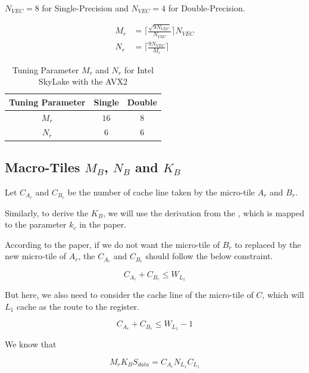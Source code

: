 $N_{VEC} = 8$ for Single-Precision and $N_{VEC} = 4$ for Double-Precision.

\begin{align*}
    M_r &= \lceil \frac{ \sqrt{9 N_{VEC}} }{N_{VEC}} \rceil N_{VEC} \\
    N_r &= \lceil \frac{ 9 N_{VEC} }{M_r} \rceil
\end{align*}

\begin{table}[ht]
    \centering
    \caption{Tuning Parameter $M_r$ and $N_r$ for Intel SkyLake with the AVX2}
    \begin{tabular}{|c|c|c|}
        \hline
        \textbf{Tuning Parameter} & \textbf{Single} & \textbf{Double}\\
        \hline
        $M_r$   & $16$ & $8$ \\
        \hline
        $N_r$   & $6$ & $6$ \\
        \hline
    \end{tabular}
\end{table}

\subsection{Macro-Tiles $M_B$, $N_B$ and $K_B$}

Let $C_{A_r}$ and $C_{B_r}$ be the number of cache line taken by the micro-tile $A_r$ and $B_r$.

Similarly, to derive the $K_B$, we will use the derivation from the \cite{BLIS}, which is 
mapped to the parameter $k_c$ in the paper.

According to the paper, if we do not want the micro-tile of $B_r$ 
to replaced by the new micro-tile of $A_r$, the $C_{A_r}$ and $C_{B_r}$  should 
follow the below constraint.

\[C_{A_r} + C_{B_r} \leq W_{L_1}\]

But here, we also need to consider the cache line of the micro-tile of $C$, which will $L_1$
cache as the route to the register.

\begin{equation}
    C_{A_r} + C_{B_r} \leq W_{L_1} - 1
    \label{eq:mtm_tuning_CAr_CBr}
\end{equation}

We know that

\begin{equation}
    M_r K_B S_{data} = C_{A_r} N_{L_1} C_{L_1}
    \label{eq:mtm_tuning_KB_CAr}
\end{equation}

